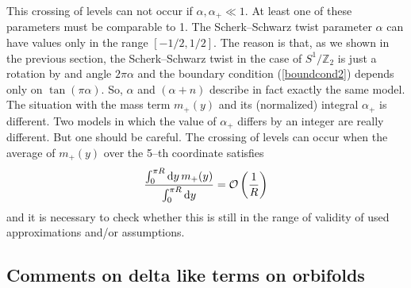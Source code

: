 \documentclass[a4paper,12pt]{article}
\def\al{\alpha}
\def\d{{\rm d}}
\def\ZZ{\mathbb Z}
\begin{document}
This crossing of levels can not occur if $\al,\al_+\ll1$. At least one
of these parameters must be comparable to 1. The Scherk--Schwarz twist
parameter $\al$ can have values only in the range $[-1/2,1/2]$. The
reason is that, as we shown in the previous section, the
Scherk--Schwarz twist in the case of $S^1/\ZZ_2$ is just a rotation by
and angle $2\pi\al$ and the boundary condition (\ref{boundcond2}) 
depends only on $\tan(\pi\al)$. So, $\al$ and $(\al+n)$ describe in
fact exactly the same model. The situation with the mass term $m_+(y)$
and its (normalized) integral $\al_+$ is different. Two models in
which the value of $\al_+$ differs by an integer are really
different. But one should be careful. The crossing of levels can
occur when the average of $m_+(y)$ over the 5--th coordinate satisfies
\begin{equation}
\frac{
\int_0^{\pi R}\d y\,m_+(y)}{\int_0^{\pi R}\d y}
={\cal O}\left(\frac{1}{R}\right)
\end{equation}
and it is necessary to check whether this is still in the range of
validity of used approximations and/or assumptions.




\subsection{Comments on delta like terms on orbifolds}
\end{document}
